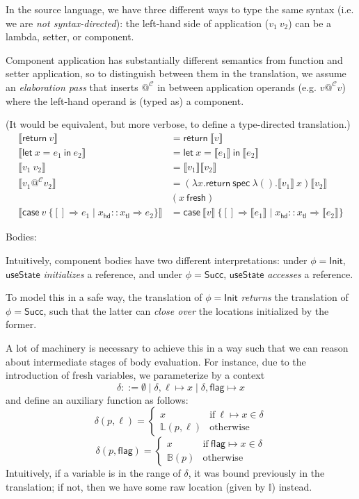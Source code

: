 \documentclass{article}
\newcommand{\mf}[1]{\mathsf{#1}}
\newcommand{\mc}[1]{\mathcal{#1}}
\newcommand{\llrr}[1]{\llbracket #1 \rrbracket}
\newcommand{\C}{\mc{C}}
\newcommand{\I}{\mathbb{I}}
\newcommand{\elet}[3]{\mf{let}\ #1 = #2\ \mf{in}\ #3}
\newcommand{\eret}[1]{\mf{return}\ #1}
\newcommand{\ecase}[5]{\mf{case}\ #1\ \{#2 \Rightarrow #3 \mid #4 \Rightarrow #5\}}
\begin{document}
In the source language, we have three different ways
to type the same syntax (i.e. we are \emph{not syntax-directed}):
the left-hand side of application
($v_1\ v_2$) can be a lambda, setter, or component.

Component application has substantially different semantics
from function and setter application,
so to distinguish between them
in the translation, we assume an \emph{elaboration pass}
that inserts $@^\C$ in between application operands
(e.g. $v @^\C v$) where
the left-hand operand is (typed as) a component.

(It would be equivalent, but more verbose,
to define a type-directed translation.)
\begin{align*}
\llrr{\eret{v}} &= \eret{\llrr{v}}\\
\llrr{\elet{x}{e_1}{e_2}} &= \elet{x}{\llrr{e_1}}{\llrr{e_2}}\\
\llrr{v_1\ v_2} &= \llrr{v_1}\llrr{v_2}\\
\llrr{v_1 @^\C v_2} &= (\lambda x.\eret{
  \mf{spec}\ \lambda ().\llrr{v_1}\:x
}) \llrr{v_2}\\
&(x\ \mf{fresh})\\
\llrr{\ecase{v}{[]}{e_1}{x_\mf{hd} :: x_\mf{tl}}{e_2}}
&= \ecase{\llrr{v}}{[]}{\llrr{e_1}}{x_\mf{hd} :: x_\mf{tl}}{\llrr{e_2}}
\end{align*}

Bodies:

Intuitively, component bodies have two different interpretations:
under $\phi=\mf{Init}$, $\mf{useState}$ \emph{initializes}
a reference, and under $\phi=\mf{Succ}$, $\mf{useState}$
\emph{accesses} a reference.

To model this in a safe way, the translation of $\phi=\mf{Init}$
\emph{returns} the translation of $\phi=\mf{Succ}$,
such that the latter can \emph{close over} the locations
initialized by the former.

A lot of machinery is necessary to achieve this in a way
such that we can reason about intermediate stages of body evaluation.
For instance, due to the introduction of fresh variables,
we parameterize by a context
$$\delta ::= \emptyset \mid \delta, \ell \mapsto x 
\mid \delta, \mf{flag} \mapsto x$$
and define an auxiliary function as follows:
\[\delta(p, \ell) = \begin{cases}
  x & \text{if}\ \ell \mapsto x \in \delta\\
  \mathbb{L}(p, \ell) & \text{otherwise}
\end{cases}\]
\[\delta(p, \mf{flag}) = \begin{cases}
  x & \text{if}\ \mf{flag} \mapsto x \in \delta\\
  \mathbb{B}(p) & \text{otherwise}
\end{cases}\]
Intuitively, if a variable is in the range of $\delta$,
it was bound previously in the translation;
if not, then we have some raw location (given by $\I$)
instead.
\end{document}
